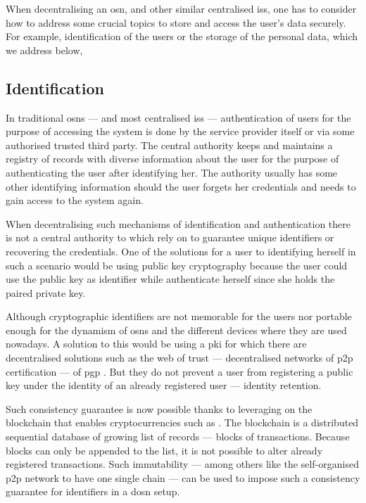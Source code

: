 When decentralising an \ac{osn}, and other similar centralised \acp{is}, one has 
to consider how to address some crucial topics to store and access the user's data 
securely. For example, identification of the users or the storage of the personal 
data, which we address below, 

\subsection{Identification}
    \label{subsection:thesis:indentification}
In traditional \acp{osn} --- and most centralised \acp{is} 
--- authentication of users for the purpose of accessing the system is done by the 
service provider itself or via some authorised trusted third party. The central 
authority keeps and maintains a registry of records with diverse information about 
the user for the purpose of authenticating the user after identifying her. The authority 
usually has some other identifying information should the user forgets her credentials 
and needs to gain access to the system again.

When decentralising such mechanisms of identification and authentication there is 
not a central authority to which rely on to guarantee unique identifiers or recovering 
the credentials. One of the solutions for a user to identifying herself in such 
a scenario would be using public key cryptography because the user could use the 
public key as identifier while authenticate herself since she holds the paired private 
key. 

Although cryptographic identifiers are not memorable for the users nor portable 
enough for the dynamism of \acp{osn} and the different devices where they are used 
nowadays. A solution to this would be using a \ac{pki} for which there are decentralised 
solutions such as the web of trust ---  decentralised networks of \ac{p2p} certification 
--- of \ac{pgp} \cite{Stallings95, Abdul97}. But they do not prevent a user from 
registering a public key under the identity of an already registered user --- identity 
retention. 

Such consistency guarantee is now possible thanks to leveraging on the blockchain 
that enables cryptocurrencies such as \Bitcoin \cite{Nakamoto08}. The blockchain 
is a distributed sequential database of growing list of records --- blocks of transactions. 
Because blocks can only be appended to the list, it is not possible to alter already 
registered transactions. Such immutability --- among others like the self-organised 
\ac{p2p} network to have one single chain --- can be used to impose such a consistency 
guarantee for identifiers in a \ac{dosn} setup.

